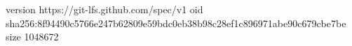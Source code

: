 version https://git-lfs.github.com/spec/v1
oid sha256:8f94490c5766e247b62809e59bdc0eb38b98c28ef1c896971abe90c679cbe7be
size 1048672
